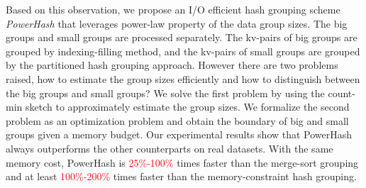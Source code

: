 Based on this observation, we propose an I/O efficient hash grouping scheme \emph{PowerHash} that leverages power-law property of the data group sizes. The big groups and small groups are processed separately. The kv-pairs of big groups are grouped by indexing-filling method, and the kv-pairs of small groups are grouped by the partitioned hash grouping approach. However there are two problems raised, how to estimate the group sizes efficiently and how to distinguish between the big groups and small groups? We solve the first problem by using the count-min sketch \cite{Cormode2009Count} to approximately estimate the group sizes. We formalize the second problem as an optimization problem and obtain the boundary of big and small groups given a memory budget. Our experimental results show that PowerHash always outperforms the other counterparts on real datasets. With the same memory cost, PowerHash is \textcolor{red}{25\%-100\%} times faster than the merge-sort grouping and at least \textcolor{red}{100\%-200\%} times faster than the memory-constraint hash grouping.

